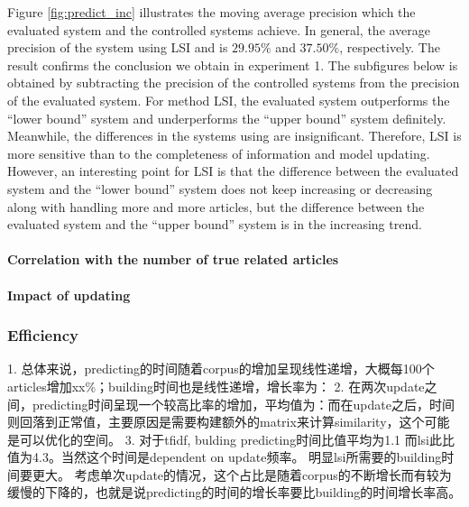 Figure \ref{fig:predict_inc} illustrates the moving average precision which the evaluated system and the controlled systems achieve. In general, the average precision of the system using LSI and \tfidf{} is $29.95\%$ and $37.50\%$, respectively. The result confirms the conclusion we obtain in experiment 1. The subfigures below is obtained by subtracting the precision of the controlled systems from the precision of the evaluated system. For method LSI, the evaluated system outperforms the ``lower bound'' system and underperforms the ``upper bound'' system definitely. Meanwhile, the differences in the systems using \tfidf{} are insignificant. Therefore, LSI is more sensitive than \tfidf{} to the completeness of information and model updating. However, an interesting point for LSI is that the difference between the evaluated system and the ``lower bound'' system does not keep increasing or decreasing along with handling more and more articles, but the difference between the evaluated system and the ``upper bound'' system is in the increasing trend. 



\paragraph{Correlation with the number of true related articles}

\paragraph{Impact of updating}


\subsubsection{Efficiency}

1. 总体来说，predicting的时间随着corpus的增加呈现线性递增，大概每100个articles增加xx\%；building时间也是线性递增，增长率为：
2. 在两次update之间，predicting时间呈现一个较高比率的增加，平均值为：而在update之后，时间则回落到正常值，主要原因是需要构建额外的matrix来计算similarity，这个可能是可以优化的空间。
3. 对于tfidf, bulding predicting时间比值平均为1.1 而lsi此比值为4.3。当然这个时间是dependent on update频率。 明显lsi所需要的building时间要更大。 考虑单次update的情况，这个占比是随着corpus的不断增长而有较为缓慢的下降的，也就是说predicting的时间的增长率要比building的时间增长率高。


